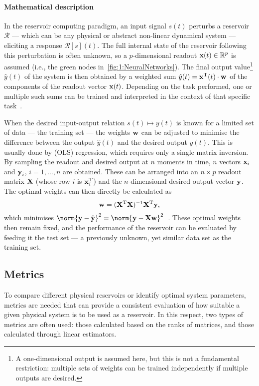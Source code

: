 \paragraph{Mathematical description}
In the reservoir computing paradigm, an input signal $s(t)$ perturbs a reservoir $\mathcal{R}$ --- which can be any physical or abstract non-linear dynamical system --- eliciting a response $\mathcal{R}[s](t)$.
The full internal state of the reservoir following this perturbation is often unknown, so a $p$-dimensional readout $\boldsymbol{\mathbf{x}}(t) \in \mathbb{R}^p$ is assumed (i.e., the green nodes in~\cref{fig:1:NeuralNetworks}).
The final output value\footnote{
	A one-dimensional output is assumed here, but this is not a fundamental restriction: multiple sets of weights can be trained independently if multiple outputs are desired.
} $\hat{y}(t)$ of the system is then obtained by a weighted sum $\hat{y}(t) = \boldsymbol{\mathbf{x}}^\mathrm{T}(t) \cdot \boldsymbol{\mathbf{w}}$ of the components of the readout vector $\boldsymbol{\mathbf{x}}(t)$.
Depending on the task performed, one or multiple such sums can be trained and interpreted in the context of that specific task~\cite{RC_RecentAdvances}. \par %
When the desired input-output relation $s(t) \mapsto y(t)$ is known for a limited set of data --- the training set --- the weights $\boldsymbol{\mathbf{w}}$ can be adjusted to minimise the difference between the output $\hat{y}(t)$ and the desired output $y(t)$.
This is usually done by  (OLS) regression, which requires only a single matrix inversion.
By sampling the readout and desired output at $n$ moments in time, $n$ vectors $\boldsymbol{\mathbf{x}}_i$ and $\boldsymbol{\mathbf{y}}_i$, $i = 1, \dots, n$ are obtained.
These can be arranged into an $n \times p$ readout matrix $\boldsymbol{\mathbf{X}}$ (whose row $i$ is $\boldsymbol{\mathbf{x}}_i^\mathrm{T}$) and the $n$-dimensional desired output vector $\boldsymbol{\mathbf{y}}$.
The optimal weights can then directly be calculated as
\begin{equation}
	\boldsymbol{\mathbf{w}} = (\boldsymbol{\mathbf{X}}^\mathrm{T} \boldsymbol{\mathbf{X}})^{-1} \boldsymbol{\mathbf{X}}^\mathrm{T} \boldsymbol{\mathbf{y}} \mathrm{,}
\end{equation}
which minimises $\norm{\vc{y} - \hat{\vc{y}}}^2 = \norm{\vc{y} - \vc{X}\vc{w}}^2$~\cite{RC_NNN}.
These optimal weights then remain fixed, and the performance of the reservoir can be evaluated by feeding it the test set --- a previously unknown, yet similar data set as the training set.

\subsection{Metrics} \label{sec:1:RC_metrics}
To compare different physical reservoirs or identify optimal system parameters, metrics are needed that can provide a consistent evaluation of how suitable a given physical system is to be used as a reservoir.
In this respect, two types of metrics are often used: those calculated based on the ranks of matrices, and those calculated through linear estimators.

